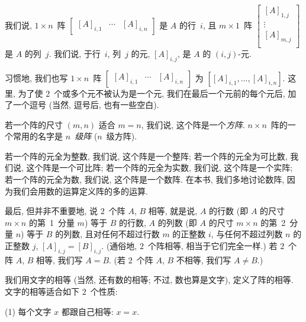 \documentclass[../libro.tex]{subfiles}
\begin{document}
\begin{definition}[阵]
    我们说, \(1 \times n\)~阵
    \(
        \begin{bmatrix}
            [A]_{i,1} & \cdots & [A]_{i,n}
        \end{bmatrix}
    \)
    是 \(A\) 的行~\(i\),
    且 \(m \times 1\)~阵
    \(
        \begin{bmatrix}
            [A]_{1,j} \\
            \vdots    \\
            [A]_{m,j} \\
        \end{bmatrix}
    \)
    是 \(A\) 的列~\(j\).
    我们说,
    于行~\(i\), 列~\(j\) 的元, \([A]_{i,j}\),
    是 \(A\) 的 \((i, j)\)-元.

    习惯地, 我们也写 \(1 \times n\)~阵
    \(
        \begin{bmatrix}
            [A]_{i,1} & \cdots & [A]_{i,n}
        \end{bmatrix}
    \)
    为
    \(
        [[A]_{i,1}, \dots, [A]_{i,n}]
    \).
    这里,
    为了使 \(2\)~个或多个元不被认为是一个元,
    我们在最后一个元前的每个元后,
    加了一个逗号
    (当然, 逗号后, 也有一些空白).

    若一个阵的尺寸 \((m, n)\) 适合 \(m = n\),
    我们说, 这个阵是一个\emph{方阵}.
    \(n \times n\)~阵的一个常用的名字是 \emph{\(n\)~级阵}
    (\(n\)~级方阵).

    若一个阵的元全为整数, 我们说, 这个阵是一个整阵;
    若一个阵的元全为可比数, 我们说, 这个阵是一个可比阵;
    若一个阵的元全为实数, 我们说, 这个阵是一个实阵;
    若一个阵的元全为数, 我们说, 这个阵是一个数阵.
    在本书, 我们多地讨论数阵,
    因为我们会用数的运算定义阵的多的运算.

    最后, 但并非不重要地, 说 \(2\)~个阵 \(A\), \(B\) 相等,
    就是说,
    \(A\) 的行数 (即 \(A\) 的尺寸 \(m \times n\) 的第~1~分量 \(m\))
    等于 \(B\) 的行数,
    \(A\) 的列数 (即 \(A\) 的尺寸 \(m \times n\) 的第~2~分量 \(n\))
    等于 \(B\) 的列数,
    且对任何不超过行数 \(m\) 的正整数 \(i\),
    与任何不超过列数 \(n\) 的正整数 \(j\),
    \([A]_{i,j} = [B]_{i,j}\).
    (通俗地, \(2\)~个阵相等, 相当于它们完全一样.)
    若 \(2\)~个阵 \(A\), \(B\) 相等,
    我们写 \(A = B\).
    (若 \(2\)~个阵 \(A\), \(B\) 不相等,
    我们写 \(A \neq B\).)
\end{definition}

我们用文字的相等
(当然, 还有数的相等; 不过, 数也算是文字),
定义了阵的相等.
文字的相等适合如下 \(2\)~个性质:

(1)
每个文字 \(x\) 都跟自己相等: \(x = x\).
\end{document}
